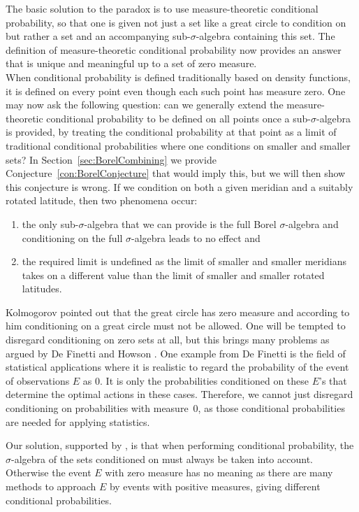 \documentclass[a4paper]{report}
\theoremstyle{plain}
\theoremstyle{definition}
\theoremstyle{remark}
\numberwithin{equation}{chapter}
\DeclareMathOperator{\1}{\mathbbm{1}}
\begin{document}
The basic solution to the paradox is to use measure-theoretic conditional probability, so that one is given not just a set like a great circle to condition on but rather a set and an accompanying sub-$\sigma$-algebra containing this set. The definition of measure-theoretic conditional probability now provides an answer that is unique and meaningful up to a set of zero measure.\\
When conditional probability is defined traditionally based on density functions, it is defined on every point even though each such point has measure zero. One may now ask the following question: can we generally extend the measure-theoretic conditional probability to be defined on all points once a sub-$\sigma$-algebra is provided, by treating the conditional probability at that point as a limit of traditional conditional probabilities where one conditions on smaller and smaller sets? In Section~\ref{sec:BorelCombining} we provide Conjecture~\ref{con:BorelConjecture} that would imply this, but we will then show this conjecture is wrong. If we condition on both a given meridian and a suitably rotated latitude, then two phenomena occur:
\begin{enumerate}
\item the only sub-$\sigma$-algebra that we can provide is the full Borel $\sigma$-algebra and conditioning on the full $\sigma$-algebra leads to no effect and
\item the required limit is undefined as the limit of smaller and smaller meridians takes on a different value than the limit of smaller and smaller rotated latitudes.
\end{enumerate}

Kolmogorov \cite{Kolmogorov33} pointed out that the great circle has zero measure and according to him conditioning on a great circle must not be allowed. One will be tempted to disregard conditioning on zero sets at all, but this brings many problems as argued by De Finetti \cite{Finetti72} and Howson \cite{Howson14}. One example from De Finetti is the field of statistical applications where it is realistic to regard the probability of the event of observations $E$ as $0$. It is only the probabilities conditioned on these $E$'s that determine the optimal actions in these cases. Therefore, we cannot just disregard conditioning on probabilities with measure~$0$, as those conditional probabilities are needed for applying statistics.

Our solution, supported by \cite{Rao88,Billingsley95,Proschan98,Easwaran08,Myrvold15,Gyenis17}, is that when performing conditional probability, the $\sigma$-algebra of the sets conditioned on must always be taken into account. Otherwise the event $E$ with zero measure has no meaning as there are many methods to approach $E$ by events with positive measures, giving different conditional probabilities. 
\end{document}
